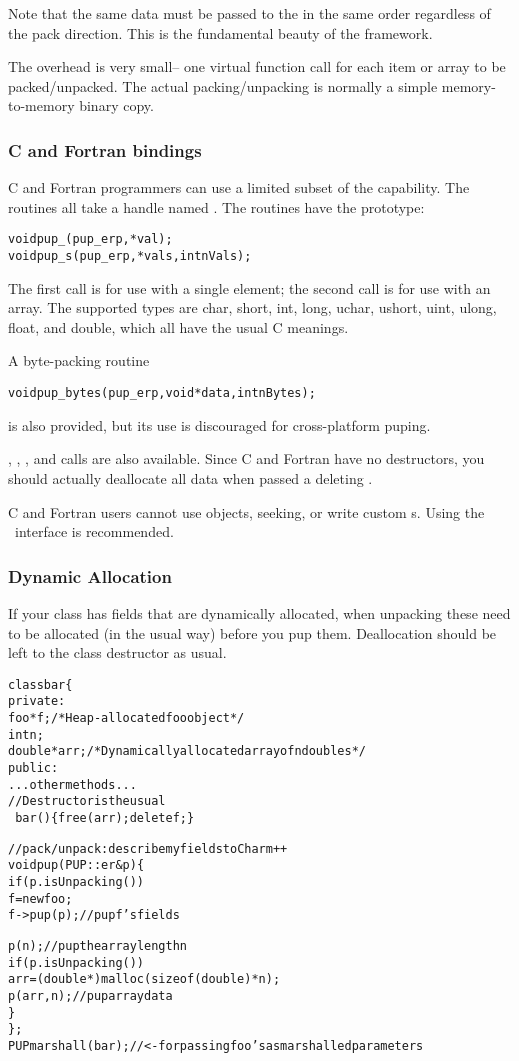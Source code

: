 Note that the same data must be passed to the  
in the same order regardless of the pack direction.
This is the fundamental beauty of the  framework.

The  overhead is very small-- one virtual function call
for each item or array to be packed/unpacked.  The actual packing/unpacking is
normally a simple memory-to-memory binary copy. 

\subsubsection{C and Fortran bindings}
C and Fortran programmers can use a limited subset of the
 capability.  The routines all take a 
handle named .  The routines 
have the prototype:
\begin{alltt}
void pup\_(pup\_er p, *val);
void pup\_s(pup\_er p, *vals,int nVals);
\end{alltt}
The first call is for use with a single element;
the second call is for use with an array.
The supported types are char, short, int, long,
uchar, ushort, uint, ulong, float, and double,
which all have the usual C meanings.

A byte-packing routine
\begin{alltt}
void pup\_bytes(pup\_er p,void *data,int nBytes);
\end{alltt}
is also provided, but its use is discouraged
for cross-platform puping.

, , ,
and  calls are also available.
Since C and Fortran have no destructors, you should 
actually deallocate all data when passed a deleting .

C and Fortran users cannot use  objects, 
seeking, or write custom s. Using the \CC\
interface is recommended.

\subsubsection{Dynamic Allocation}

If your class has fields that are dynamically allocated, when unpacking
these need to be allocated (in the usual way) before you pup them.
Deallocation should be left to the class destructor as usual.

\begin{alltt}
class bar \{
private:
    foo *f; /*Heap-allocated foo object*/
    int n;
    double *arr;/*Dynamically allocated array of n doubles*/
public:
    ...other methods...
    //Destructor is the usual
    ~bar() \{free(arr);delete f;\}
    
    //pack/unpack: describe my fields to Charm++
    void pup(PUP::er &p) \{
      if (p.isUnpacking()) 
         f=new foo;
      f->pup(p);//pup f's fields
      
      p(n);//pup the array length n
      if (p.isUnpacking()) 
         arr=(double *)malloc(sizeof(double)*n);
      p(arr,n);//pup array data
    \}
\};
PUPmarshall(bar); //<- for passing foo's as marshalled parameters
\end{alltt}


